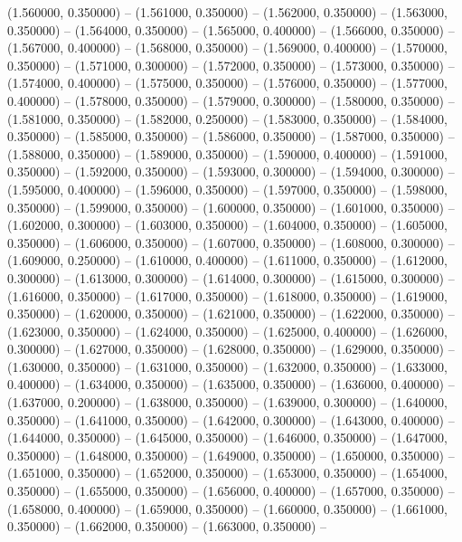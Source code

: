 (1.560000, 0.350000) -- 
(1.561000, 0.350000) -- 
(1.562000, 0.350000) -- 
(1.563000, 0.350000) -- 
(1.564000, 0.350000) -- 
(1.565000, 0.400000) -- 
(1.566000, 0.350000) -- 
(1.567000, 0.400000) -- 
(1.568000, 0.350000) -- 
(1.569000, 0.400000) -- 
(1.570000, 0.350000) -- 
(1.571000, 0.300000) -- 
(1.572000, 0.350000) -- 
(1.573000, 0.350000) -- 
(1.574000, 0.400000) -- 
(1.575000, 0.350000) -- 
(1.576000, 0.350000) -- 
(1.577000, 0.400000) -- 
(1.578000, 0.350000) -- 
(1.579000, 0.300000) -- 
(1.580000, 0.350000) -- 
(1.581000, 0.350000) -- 
(1.582000, 0.250000) -- 
(1.583000, 0.350000) -- 
(1.584000, 0.350000) -- 
(1.585000, 0.350000) -- 
(1.586000, 0.350000) -- 
(1.587000, 0.350000) -- 
(1.588000, 0.350000) -- 
(1.589000, 0.350000) -- 
(1.590000, 0.400000) -- 
(1.591000, 0.350000) -- 
(1.592000, 0.350000) -- 
(1.593000, 0.300000) -- 
(1.594000, 0.300000) -- 
(1.595000, 0.400000) -- 
(1.596000, 0.350000) -- 
(1.597000, 0.350000) -- 
(1.598000, 0.350000) -- 
(1.599000, 0.350000) -- 
(1.600000, 0.350000) -- 
(1.601000, 0.350000) -- 
(1.602000, 0.300000) -- 
(1.603000, 0.350000) -- 
(1.604000, 0.350000) -- 
(1.605000, 0.350000) -- 
(1.606000, 0.350000) -- 
(1.607000, 0.350000) -- 
(1.608000, 0.300000) -- 
(1.609000, 0.250000) -- 
(1.610000, 0.400000) -- 
(1.611000, 0.350000) -- 
(1.612000, 0.300000) -- 
(1.613000, 0.300000) -- 
(1.614000, 0.300000) -- 
(1.615000, 0.300000) -- 
(1.616000, 0.350000) -- 
(1.617000, 0.350000) -- 
(1.618000, 0.350000) -- 
(1.619000, 0.350000) -- 
(1.620000, 0.350000) -- 
(1.621000, 0.350000) -- 
(1.622000, 0.350000) -- 
(1.623000, 0.350000) -- 
(1.624000, 0.350000) -- 
(1.625000, 0.400000) -- 
(1.626000, 0.300000) -- 
(1.627000, 0.350000) -- 
(1.628000, 0.350000) -- 
(1.629000, 0.350000) -- 
(1.630000, 0.350000) -- 
(1.631000, 0.350000) -- 
(1.632000, 0.350000) -- 
(1.633000, 0.400000) -- 
(1.634000, 0.350000) -- 
(1.635000, 0.350000) -- 
(1.636000, 0.400000) -- 
(1.637000, 0.200000) -- 
(1.638000, 0.350000) -- 
(1.639000, 0.300000) -- 
(1.640000, 0.350000) -- 
(1.641000, 0.350000) -- 
(1.642000, 0.300000) -- 
(1.643000, 0.400000) -- 
(1.644000, 0.350000) -- 
(1.645000, 0.350000) -- 
(1.646000, 0.350000) -- 
(1.647000, 0.350000) -- 
(1.648000, 0.350000) -- 
(1.649000, 0.350000) -- 
(1.650000, 0.350000) -- 
(1.651000, 0.350000) -- 
(1.652000, 0.350000) -- 
(1.653000, 0.350000) -- 
(1.654000, 0.350000) -- 
(1.655000, 0.350000) -- 
(1.656000, 0.400000) -- 
(1.657000, 0.350000) -- 
(1.658000, 0.400000) -- 
(1.659000, 0.350000) -- 
(1.660000, 0.350000) -- 
(1.661000, 0.350000) -- 
(1.662000, 0.350000) -- 
(1.663000, 0.350000) -- 
